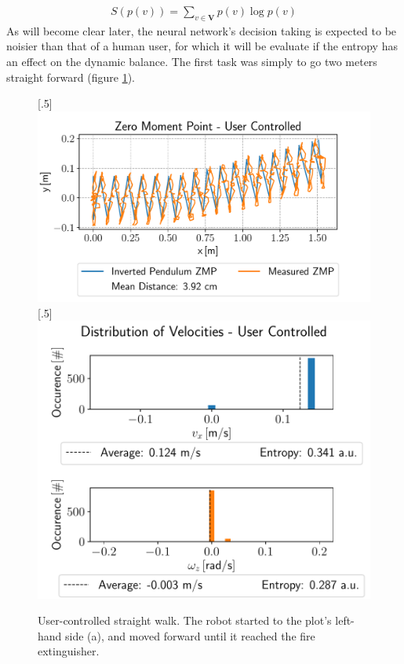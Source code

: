\begin{align}
S(p(v)) = \sum_{v\in \bm{V}}p(v)\log p(v)
\label{eq::92_entropy}
\end{align}
As will become clear later, the neural network's decision taking is expected to be noisier than that of a human user, for which it will be evaluate if the entropy has an effect on the dynamic balance. The first task was simply to go two meters straight forward (figure \ref{fig::92_uc_straight}).
\begin{figure}[h!]
	[.5\linewidth]{\includegraphics[scale=.45]{chapters/09_user_controlled_walking_experiments/img/02_test_environment/straight_walk_01_zmp.pdf}}
	[.5\linewidth]{\includegraphics[scale=.45]{chapters/09_user_controlled_walking_experiments/img/02_test_environment/straight_walk_01_entropy.pdf}}
	\caption{User-controlled straight walk. The robot started to the plot's left-hand side (a), and moved forward until it reached the fire extinguisher.}
	\label{fig::92_uc_straight}
\end{figure} 
